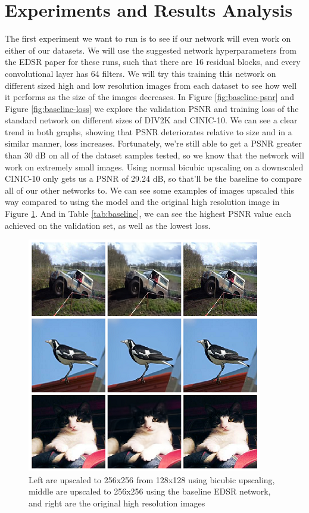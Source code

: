\documentclass[conference]{IEEEtran}
\begin{document}
\section{Experiments and Results Analysis}
The first experiment we want to run is to see if our network will even work on either of our datasets.
We will use the suggested network hyperparameters from the EDSR paper for these runs, such that there are 16 residual blocks, and every convolutional layer has 64 filters.
We will try this training this network on different sized high and low resolution images from each dataset to see how well it performs as the size of the images decreases.
In Figure \ref{fig:baseline-psnr} and Figure \ref{fig:baseline-loss} we explore the validation PSNR and training loss of the standard network on different sizes of DIV2K and CINIC-10.
We can see a clear trend in both graphs, showing that PSNR deteriorates relative to size and in a similar manner, loss increases.
Fortunately, we're still able to get a PSNR greater than 30 dB on all of the dataset samples tested, so we know that the network will work on extremely small images.
Using normal bicubic upscaling on a downscaled CINIC-10 only gets us a PSNR of 29.24 dB, so that'll be the baseline to compare all of our other networks to.
We can see some examples of images upscaled this way compared to using the model and the original high resolution image in Figure \ref{fig:ex}.
And in Table \ref{tab:baseline}, we can see the highest PSNR value each achieved on the validation set, as well as the lowest loss.
\begin{figure}[htbp]
  \centerline{\includegraphics{examples.png}}
  \caption{Left are upscaled to 256x256 from 128x128 using bicubic upscaling, middle are upscaled to 256x256 using the baseline EDSR network, and right are the original high resolution images}
  \label{fig:ex}
\end{figure}
\end{document}
